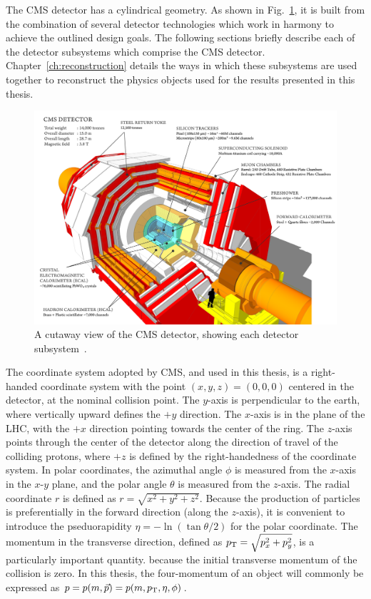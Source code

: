 The CMS detector has a cylindrical geometry. As shown in Fig.~\ref{fig:CMScutaway},
it is built from the combination
of several detector technologies which work in harmony to achieve the outlined design
goals. The following sections briefly describe each of the detector subsystems
which comprise the CMS detector. 
Chapter~\ref{ch:reconstruction} details the ways in which these subsystems 
are used together to reconstruct the physics objects used for the results
presented in this thesis.

\begin{figure}[htbp]
  \centering
   \includegraphics[width=\textwidth]{figures/LHCandCMS/CMScutaway.png}
  \caption{
    A cutaway view of the CMS detector, showing each detector 
    subsystem~\cite{1742-6596-513-2-022032}.
        }
 \label{fig:CMScutaway}
\end{figure}

The coordinate system adopted by CMS, and used in this thesis,
is a right-handed coordinate system with the point $(x, y, z) = (0, 0, 0)$
centered in the detector, at the nominal collision point. The $y$-axis 
is perpendicular to the earth, where vertically upward defines the $+y$ direction.
The $x$-axis is in the plane of the LHC, with the $+x$ direction pointing towards
the center of the ring. The $z$-axis points through the center of the detector
along the direction of travel of the colliding protons, where $+z$ is defined
by the right-handedness of the coordinate system. In polar coordinates, 
the azimuthal angle $\phi$ is measured from the $x$-axis in the $x$-$y$
plane, and the polar angle $\theta$ is measured from the $z$-axis. The radial
coordinate $r$ is defined as $r = \sqrt{x^2 + y^2 + z^2}$.
Because the production of 
particles is preferentially in the forward direction (along
the $z$-axis), it is convenient to introduce the pseduorapidity $\eta = - \ln(\tan{\theta/2})$
for the polar coordinate. The momentum in the transverse direction,
defined as $p_{\mathrm{T}} = \sqrt{p_{x}^2 + p_{y}^2}$, is a particularly important quantity.
because the initial transverse momentum of the collision is zero.
In this thesis, the four-momentum of an object will commonly be expressed as
$p = p(m, \vec{p}) = p(m, p_{\mathrm{T}}, \eta, \phi)$.

